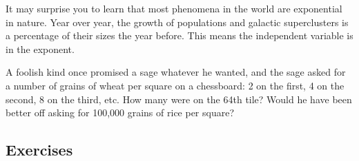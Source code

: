 

It may surprise you to learn that most phenomena in the world are exponential in nature.
Year over year, the growth of populations and galactic superclusters is a percentage of 
their sizes the year before.  This means the independent variable is in the exponent.

A foolish kind once promised a sage whatever he wanted, and the sage asked for
a number of grains of wheat per square on a chessboard: 2 on the first, 4 on the second, 
8 on the third, etc.  How many were on the 64th tile?  Would he have been better off
asking for 100,000 grains of rice per square?

\newpage
\chapterminitoc

\newpage
{}
\newpage

\newpage



\newpage
{}
\newpage

\newpage
\subsection{Exercises}
\noindent{}
\newpage
\noindent{}
\newpage
\noindent{}
\newpage
\noindent{}



